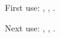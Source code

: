 \documentclass[12pt]{article}
\begin{document}
First use: , , .


Next use: , , .
\printglossaries 
\end{document}
